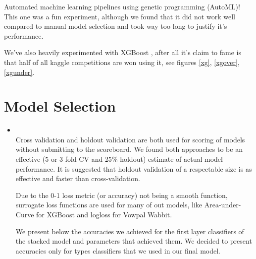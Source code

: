 Automated machine learning pipelines using genetic programming (AutoML)\cite{Olson2016EvoBio}! This one was a fun experiment, although we found that it did not work well compared to manual model selection and took way too long to justify it's performance.

We've also heavily experimented with XGBoost \cite{chen2016xgboost}, after all it's claim to fame is that half of all kaggle competitions are won using it, see figures \ref{xg}, \ref{xgover}, \ref{xgunder}.


\section{Model Selection}
\medskip
\begin{itemize}

    \item {} \\
    Cross validation and holdout validation are both used for scoring of models without submitting to the scoreboard. We found both approaches to be an effective (5 or 3 fold CV and 25\% holdout) estimate of actual model performance. It is suggested\cite{citeulike:13776474} that holdout validation of a respectable size is as effective and faster than cross-validation.

    Due to the 0-1 loss metric (or accuracy) not being a smooth function, surrogate loss functions are used for many of out models, like Area-under-Curve for XGBoost and logloss for Vowpal Wabbit.

    We present below the accuracies we achieved for the first layer classifiers of the stacked model and parameters that achieved them. We decided to present accuracies only for types classifiers that we used in our final model.


\end{itemize}

